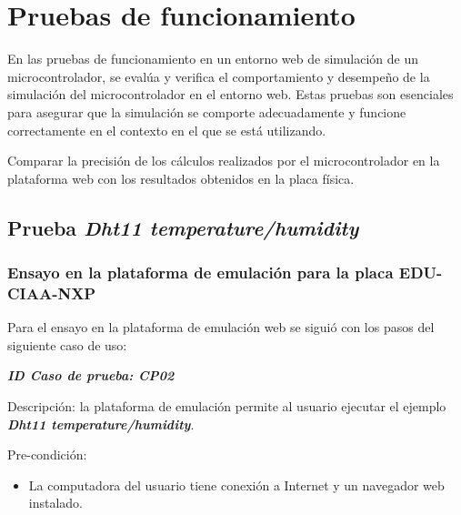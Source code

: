 \section{Pruebas de funcionamiento}  
\label{sec:Pruebas de funcionamiento}
En las pruebas de funcionamiento en un entorno web de simulación de un microcontrolador, se evalúa y verifica el comportamiento y desempeño de la simulación del microcontrolador en el entorno web. Estas pruebas son esenciales para asegurar que la simulación se comporte adecuadamente y funcione correctamente en el contexto en el que se está utilizando.

Comparar la precisión de los cálculos realizados por el microcontrolador en la plataforma web con los resultados obtenidos en la placa física.

\subsection{Prueba \textit{\textbf{Dht11 temperature/humidity}} }

\subsubsection{Ensayo en la plataforma de emulación para la placa EDU-CIAA-NXP} 
Para el ensayo en la plataforma de emulación web se siguió con los pasos del siguiente caso de uso:

\textit{\textbf{ID Caso de prueba: CP02}}

Descripción: la plataforma de emulación permite al usuario ejecutar el ejemplo \textit{\textbf{Dht11 temperature/humidity}}.

Pre-condición: 
\begin{itemize}
	\item La computadora del usuario tiene conexión a Internet y un navegador web instalado.
\end{itemize}

